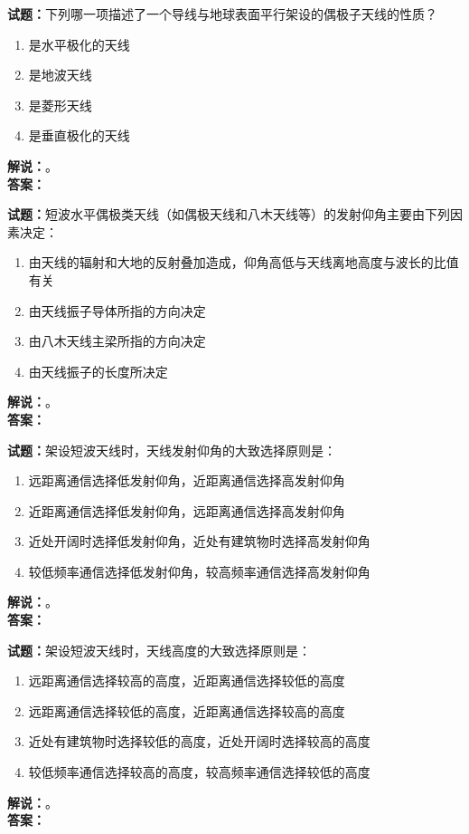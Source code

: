 \documentclass{ctexbook}
\begin{document}
\bigskip

\noindent\textbf{试题：}下列哪一项描述了一个导线与地球表面平行架设的偶极子天线的性质？
\begin{enumerate}[leftmargin=3em]
  \item 是水平极化的天线
  \item 是地波天线
  \item 是菱形天线
  \item 是垂直极化的天线
\end{enumerate}
\noindent\textbf{解说：}\textbf{}。\\\noindent\textbf{答案：}

\bigskip

\noindent\textbf{试题：}短波水平偶极类天线（如偶极天线和八木天线等）的发射仰角主要由下列因素决定：
\begin{enumerate}[leftmargin=3em]
  \item 由天线的辐射和大地的反射叠加造成，仰角高低与天线离地高度与波长的比值有关
  \item 由天线振子导体所指的方向决定
  \item 由八木天线主梁所指的方向决定
  \item 由天线振子的长度所决定
\end{enumerate}
\noindent\textbf{解说：}\textbf{}。\\\noindent\textbf{答案：}

\bigskip

\noindent\textbf{试题：}架设短波天线时，天线发射仰角的大致选择原则是：
\begin{enumerate}[leftmargin=3em]
  \item 远距离通信选择低发射仰角，近距离通信选择高发射仰角
  \item 近距离通信选择低发射仰角，远距离通信选择高发射仰角
  \item 近处开阔时选择低发射仰角，近处有建筑物时选择高发射仰角
  \item 较低频率通信选择低发射仰角，较高频率通信选择高发射仰角
\end{enumerate}
\noindent\textbf{解说：}\textbf{}。\\\noindent\textbf{答案：}

\bigskip

\noindent\textbf{试题：}架设短波天线时，天线高度的大致选择原则是：
\begin{enumerate}[leftmargin=3em]
  \item 远距离通信选择较高的高度，近距离通信选择较低的高度
  \item 远距离通信选择较低的高度，近距离通信选择较高的高度
  \item 近处有建筑物时选择较低的高度，近处开阔时选择较高的高度
  \item 较低频率通信选择较高的高度，较高频率通信选择较低的高度
\end{enumerate}
\noindent\textbf{解说：}\textbf{}。\\\noindent\textbf{答案：}
\end{document}
